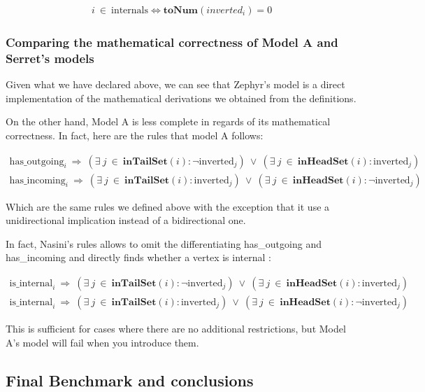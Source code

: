 \begin{align}
    i~\in~\text{internals} \iff \textbf{toNum}(inverted_{i}) = 0
\end{align}

\subsubsection{Comparing the mathematical correctness of Model A and Serret's models}

Given what we have declared above, we can see that Zephyr's model is a direct implementation of the mathematical derivations we obtained from the definitions.

On the other hand, Model A is less complete in regards of its mathematical correctness.
In fact, here are the rules that model A follows:

\begin{align}
    \text{has\_outgoing}_{i}~\Longrightarrow~(\exists~j~\in~\textbf{inTailSet}(i): \lnot\text{inverted}_{j})~\vee~(\exists~j~\in~\textbf{inHeadSet}(i): \text{inverted}_{j}) \\
    \text{has\_incoming}_{i}~\Longrightarrow~(\exists~j~\in~\textbf{inTailSet}(i): \text{inverted}_{j})~\vee~(\exists~j~\in~\textbf{inHeadSet}(i): \lnot\text{inverted}_{j})
\end{align}

Which are the same rules we defined above with the exception that it use a unidirectional implication instead of a bidirectional one.

In fact, Nasini's rules allows to omit the differentiating has\_outgoing and has\_incoming and directly finds whether a vertex is internal :

\begin{align}
    \text{is\_internal}_{i}~\Longrightarrow~(\exists~j~\in~\textbf{inTailSet}(i): \lnot\text{inverted}_{j})~\vee~(\exists~j~\in~\textbf{inHeadSet}(i): \text{inverted}_{j}) \\
    \text{is\_internal}_{i}~\Longrightarrow~(\exists~j~\in~\textbf{inTailSet}(i): \text{inverted}_{j})~\vee~(\exists~j~\in~\textbf{inHeadSet}(i): \lnot\text{inverted}_{j})
\end{align}

This is sufficient for cases where there are no additional restrictions, but Model A's model will fail when you introduce them.

\subsection{Final Benchmark and conclusions} \label{sec:benchmark}

